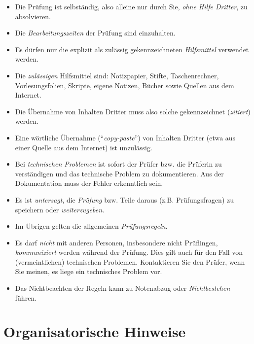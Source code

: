 \documentclass[
  a4paper,
  DIV=11]{scrreprt}
\providecommand{\tightlist}{%
  \setlength{\itemsep}{0pt}\setlength{\parskip}{0pt}}\usepackage{longtable,booktabs,array}
\theoremstyle{definition}
\theoremstyle{remark}
\begin{document}
\begin{itemize}
\tightlist
\item
  Die Prüfung ist selbständig, also alleine nur durch Sie, \emph{ohne
  Hilfe Dritter}, zu absolvieren.
\item
  Die \emph{Bearbeitungszeiten} der Prüfung sind einzuhalten.
\item
  Es dürfen nur die explizit als zulässig gekennzeichneten
  \emph{Hilfsmittel} verwendet werden.
\item
  Die \emph{zulässigen} Hilfsmittel sind: Notizpapier, Stifte,
  Taschenrechner, Vorlesungsfolien, Skripte, eigene Notizen, Bücher
  sowie Quellen aus dem Internet.
\item
  Die Übernahme von Inhalten Dritter muss also solche gekennzeichnet
  (\emph{zitiert}) werden.
\item
  Eine wörtliche Übernahme (``\emph{copy-paste}'') von Inhalten Dritter
  (etwa aus einer Quelle aus dem Internet) ist unzulässig.
\item
  Bei \emph{technischen Problemen} ist sofort der Prüfer bzw. die
  Prüferin zu verständigen und das technische Problem zu dokumentieren.
  Aus der Dokumentation muss der Fehler erkenntlich sein.
\item
  Es ist \emph{untersagt}, die \emph{Prüfung} bzw. Teile daraus (z.B.
  Prüfungsfragen) zu speichern oder \emph{weiterzugeben.}
\item
  Im Übrigen gelten die allgemeinen \emph{Prüfungsregeln}.
\item
  Es darf \emph{nicht} mit anderen Personen, insbesondere nicht
  Prüflingen, \emph{kommuniziert} werden während der Prüfung. Dies gilt
  auch für den Fall von (vermeintlichen) technischen Problemen.
  Kontaktieren Sie den Prüfer, wenn Sie meinen, es liege ein technisches
  Problem vor.
\item
  Das Nichtbeachten der Regeln kann zu Notenabzug oder
  \emph{Nichtbestehen} führen.
\end{itemize}

\hypertarget{organisatorische-hinweise}{%
\section{Organisatorische Hinweise}\label{organisatorische-hinweise}}
\end{document}
